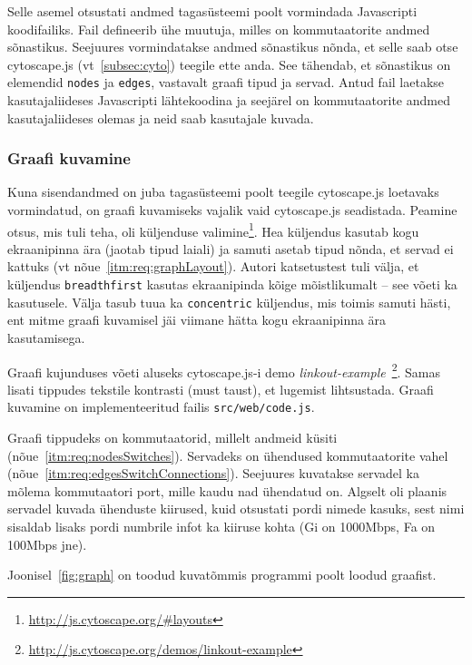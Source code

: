 \documentclass[12pt]{article}
\begin{document}
Selle asemel otsustati andmed tagasüsteemi poolt vormindada Javascripti koodifailiks.
Fail defineerib ühe muutuja, milles on kommutaatorite andmed sõnastikus.
Seejuures vormindatakse andmed sõnastikus nõnda, et selle saab otse cytoscape.js
(vt~\ref{subsec:cyto}) teegile ette anda.
See tähendab, et sõnastikus on elemendid \texttt{nodes} ja \texttt{edges}, vastavalt graafi tipud
ja servad.
Antud fail laetakse kasutajaliideses Javascripti lähtekoodina ja seejärel on kommutaatorite
andmed kasutajaliideses olemas ja neid saab kasutajale kuvada.

\subsubsection{Graafi kuvamine} \label{graphDisplay}
Kuna sisendandmed on juba tagasüsteemi poolt teegile cytoscape.js loetavaks vormindatud, on
graafi kuvamiseks vajalik vaid cytoscape.js seadistada.
Peamine otsus, mis tuli teha, oli küljenduse
valimine\footnote{\url{http://js.cytoscape.org/\#layouts}}.
Hea küljendus kasutab kogu ekraanipinna ära (jaotab tipud laiali) ja samuti asetab tipud nõnda, et
servad ei kattuks (vt nõue~\ref{itm:req:graphLayout}).
Autori katsetustest tuli välja, et küljendus \texttt{breadthfirst} kasutas ekraanipinda kõige
mõistlikumalt -- see võeti ka kasutusele.
Välja tasub tuua ka \texttt{concentric} küljendus, mis toimis samuti hästi, ent mitme graafi
kuvamisel jäi viimane hätta kogu ekraanipinna ära kasutamisega.

Graafi kujunduses võeti aluseks cytoscape.js-i demo
\textit{linkout-example}~\footnote{\url{http://js.cytoscape.org/demos/linkout-example}}.
Samas lisati tippudes tekstile kontrasti (must taust), et lugemist lihtsustada.
Graafi kuvamine on implementeeritud failis \texttt{src/web/code.js}.

Graafi tippudeks on kommutaatorid, millelt andmeid küsiti (nõue~\ref{itm:req:nodesSwitches}).
Servadeks on ühendused kommutaatorite vahel (nõue~\ref{itm:req:edgesSwitchConnections}).
Seejuures kuvatakse servadel ka mõlema kommutaatori port, mille kaudu nad ühendatud on.
Algselt oli plaanis servadel kuvada ühenduste kiirused, kuid otsustati pordi nimede kasuks, sest
nimi sisaldab lisaks pordi numbrile infot ka kiiruse kohta (Gi on 1000Mbps, Fa on 100Mbps jne).

Joonisel~\ref{fig:graph} on toodud kuvatõmmis programmi poolt loodud graafist.
\end{document}
